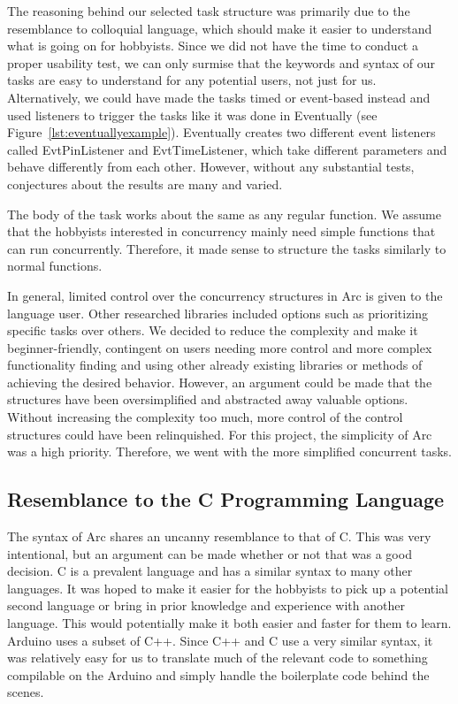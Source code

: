 The reasoning behind our selected task structure was primarily due to the resemblance to colloquial language, which should make it easier to understand what is going on for hobbyists. Since we did not have the time to conduct a proper usability test, we can only surmise that the keywords and syntax of our tasks are easy to understand for any potential users, not just for us. Alternatively, we could have made the tasks timed or event-based instead and used listeners to trigger the tasks like it was done in Eventually (see Figure~\ref{lst:eventuallyexample}). Eventually creates two different event listeners called EvtPinListener and EvtTimeListener, which take different parameters and behave differently from each other. However, without any substantial tests, conjectures about the results are many and varied.

The body of the task works about the same as any regular function. We assume that the hobbyists interested in concurrency mainly need simple functions that can run concurrently. Therefore, it made sense to structure the tasks similarly to normal functions.

In general, limited control over the concurrency structures in Arc is given to the language user. Other researched libraries included options such as prioritizing specific tasks over others. We decided to reduce the complexity and make it beginner-friendly, contingent on users needing more control and more complex functionality finding and using other already existing libraries or methods of achieving the desired behavior. However, an argument could be made that the structures have been oversimplified and abstracted away valuable options. Without increasing the complexity too much, more control of the control structures could have been relinquished. For this project, the simplicity of Arc was a high priority. Therefore, we went with the more simplified concurrent tasks.

\subsection{Resemblance to the C Programming Language}

The syntax of Arc shares an uncanny resemblance to that of C. This was very intentional, but an argument can be made whether or not that was a good decision. C is a prevalent language and has a similar syntax to many other languages. It was hoped to make it easier for the hobbyists to pick up a potential second language or bring in prior knowledge and experience with another language. This would potentially make it both easier and faster for them to learn. Arduino uses a subset of C++. Since C++ and C use a very similar syntax, it was relatively easy for us to translate much of the relevant code to something compilable on the Arduino and simply handle the boilerplate code behind the scenes.


